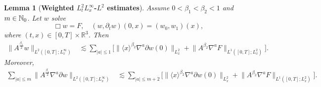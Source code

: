 \documentclass[11pt,twoside]{article}
\def\N{\mathop{\mathbb N\kern 0pt}\nolimits}
\theoremstyle{plain}
\newtheorem{lemma}[theorem]{Lemma}
\theoremstyle{definition}
\theoremstyle{assumption}
\numberwithin{equation}{section}
\begin{document}
	
	
	
	
	
	
	
	
	\begin{lemma}[{\bf Weighted \(L^2_tL^\infty_x\)-\(L^2\) estimates}]
		\label{lem:weak-weighted-L2t-Linfty-L2}
		Assume \(0<\beta_1<\beta_2<1\) and $m\in\N_0$.
		Let \(w\) solve
		\begin{equation*}
			\Box w=F,\quad
			(w,\partial_t w)(0,x)=(w_0,w_1)(x),
		\end{equation*}
		where  \((t,x)\in [0,T]\times\mathbb R^3\). Then
		\begin{equation}
			\label{eq:weak-L2t-Linfty-L2-w}
			\begin{aligned}
				\big\|
				A^{\frac{\beta_1}{2}}w
				\big\|_{L^2([0,T];L^\infty_x)}
				&\lesssim
				\sum_{|a|\le1}
				\big[
				\big\|
				\langle x\rangle^{\beta_2}
				\nabla^a\partial w(0)
				\big\|_{L^2_x}
				+
				\big\|
				A^{\beta_2}\nabla^aF
				\big\|_{L^1([0,T];L^2_x)}
				\big].
			\end{aligned}
		\end{equation}
		Moreover,
		\begin{equation}
			\label{eq:weak-L2t-Linfty-L2-dw}
			\begin{aligned}
				\sum_{|a|\le m}
				\big\|
				A^{\frac{\beta_1}{2}}\nabla^a\partial w
				\big\|_{L^2([0,T];L^\infty_x)}
				&\lesssim
				\sum_{|a|\le m+2}
				\big[
				\big\|
				\langle x\rangle^{\beta_2}
				\nabla^a\partial w(0)
				\big\|_{L^2_x}
				+\big\|
				A^{\beta_2}\nabla^aF
				\big\|_{L^1([0,T];L^2_x)}
				\big].
			\end{aligned}
		\end{equation}
	\end{lemma}
	
	
	
\end{document}

